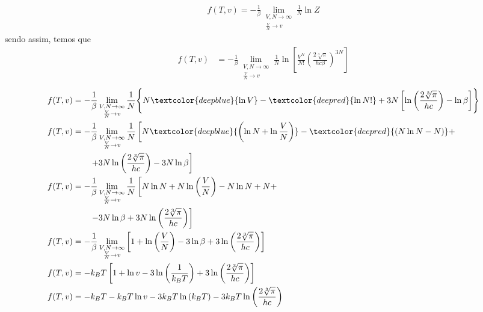 \begin{prob}
\begin{sol}
\begin{enumerate}[label=\alph *)]
      \begin{align}
        f(T,v)=-\frac{1}{\beta}\lim_{\substack{V,N\to\infty\\\frac{V}{N}\to v}}\frac{1}{N}\ln Z
      \end{align}
      sendo assim, temos que
      \begin{align}
        f(T,v)&=-\frac{1}{\beta}\lim_{\substack{V,N\to\infty\\\frac{V}{N}\to v}}\frac{1}{N}\ln\left[\frac{V^N}{N!}\left(\frac{2\sqrt[3]{\pi}}{hc\beta}\right)^{3N}\right]\nonumber
      \end{align}
      \begin{align}
        \begin{split}          
          f(T,v)&=-\frac{1}{\beta}\lim_{\substack{V,N\to\infty\\\frac{V}{N}\to v}}\frac{1}{N}\Biggl\{N
          \textcolor{deepblue}{%
            \ln V
          }-\textcolor{deepred}{%
            \ln N!
          }+3N\left[\ln\left(\frac{2\sqrt[3]{\pi}}{hc}\right)-\ln\beta\right]\Biggr\}\\
          f(T,v)&=-\frac{1}{\beta}\lim_{\substack{V,N\to\infty\\\frac{V}{N}\to v}}\frac{1}{N}\left[N
          \textcolor{deepblue}{%
            \left(\ln N+\ln \frac{V}{N}\right)
          }-\textcolor{deepred}{%
            \left(N\ln N-N\right)
          }+\right.\\
          &\qquad\left.+3N\ln\left(\frac{2\sqrt[3]{\pi}}{hc}\right)-3N\ln\beta\right]\\
          f(T,v)&=-\frac{1}{\beta}\lim_{\substack{V,N\to\infty\\\frac{V}{N}\to v}}\frac{1}{N}\left[N\ln N +N\ln\left(\frac{V}{N}\right)-N\ln N +N+\right.\\&\qquad\left.-3N\ln \beta+3N\ln\left(\frac{2\sqrt[3]{\pi}}{hc}\right)\right]\\
          f(T,v)&=-\frac{1}{\beta}\lim_{\substack{V,N\to\infty\\\frac{V}{N}\to v}}\left[1+\ln\left(\frac{V}{N}\right)-3\ln\beta+3\ln\left(\frac{2\sqrt[3]{\pi}}{hc}\right)\right]\\
          f(T,v)&=-k_BT\left[1+\ln v-3\ln\left(\frac{1}{k_BT}\right)+3\ln\left(\frac{2\sqrt[3]{\pi}}{hc}\right)\right]\\
          f(T,v)&=-k_BT-k_BT\ln v-3k_BT\ln\left(k_BT\right)-3k_BT\ln\left(\frac{2\sqrt[3]{\pi}}{hc}\right)
        \end{split}
      \end{align}

\end{enumerate}
\end{sol}
\end{prob}
